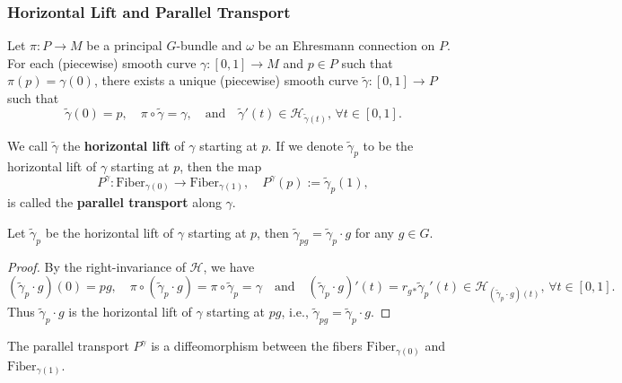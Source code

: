 \subsubsection{Horizontal Lift and Parallel Transport}
Let $\pi: P\to M$ be a principal $G$-bundle and $\omega$ be an Ehresmann connection on $P$. 
For each (piecewise) smooth curve $\gamma: [0,1]\to M$ and $p\in P$ such that $\pi(p) = \gamma(0)$,
there exists a unique (piecewise) smooth curve $\tilde{\gamma}: [0,1]\to P$ such that 
\begin{equation*}
    \tilde{\gamma}(0) = p, \quad \pi\circ\tilde{\gamma} = \gamma, \quad \text{and}\quad 
    \tilde{\gamma}'(t)\in\mathcal{H}_{\tilde{\gamma}(t)},\,\forall t\in[0,1].
\end{equation*}
\begin{definition}
    We call $\tilde{\gamma}$ the \textbf{horizontal lift} of $\gamma$ starting at $p$. 
    If we denote $\tilde{\gamma}_p$ to be the horizontal lift of $\gamma$ starting at $p$, then the map
    \begin{equation*}
        P^\gamma: \mathrm{Fiber}_{\gamma(0)}\to \mathrm{Fiber}_{\gamma(1)}, \quad P^\gamma(p) := \tilde{\gamma}_p(1),
    \end{equation*}
    is called the \textbf{parallel transport} along $\gamma$.
\end{definition}
\begin{proposition}
    Let $\tilde{\gamma}_p$ be the horizontal lift of $\gamma$ starting at $p$, 
    then $\tilde{\gamma}_{pg} = \tilde{\gamma}_p\cdot g$ for any $g\in G$.
\end{proposition}
\begin{proof}
    By the right-invariance of $\mathcal{H}$, we have 
    \begin{equation*}
        (\tilde{\gamma}_p\cdot g)(0) = pg, \quad \pi\circ(\tilde{\gamma}_p\cdot g) = \pi\circ\tilde{\gamma}_p = \gamma 
        \quad \text{and}\quad 
        (\tilde{\gamma}_p\cdot g)'(t)=r_g{}_*\tilde{\gamma}_p'(t)\in\mathcal{H}_{(\tilde{\gamma}_p\cdot g)(t)},\,\forall t\in[0,1].
    \end{equation*}
    Thus $\tilde{\gamma}_p\cdot g$ is the horizontal lift of $\gamma$ starting at $pg$, i.e., 
    $\tilde{\gamma}_{pg} = \tilde{\gamma}_p\cdot g$.
\end{proof}
\begin{corollary}
    The parallel transport $P^\gamma$ is a diffeomorphism between the fibers 
    $\mathrm{Fiber}_{\gamma(0)}$ and $\mathrm{Fiber}_{\gamma(1)}$.
\end{corollary}
